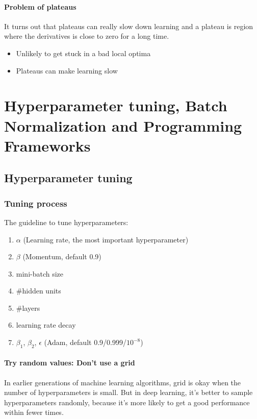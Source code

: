 \documentclass[UTF8]{article}
\begin{document}
\paragraph{Problem of plateaus}
It turns out that plateaus can really slow down learning and a plateau is region where the
derivatives is close to zero for a long time.

\begin{itemize}
    \item Unlikely to get stuck in a bad local optima
    \item Plateaus can make learning slow
\end{itemize}


\section{Hyperparameter tuning, Batch Normalization and Programming Frameworks}
\subsection{Hyperparameter tuning}
\subsubsection{Tuning process}
The guideline to tune hyperparameters:
\begin{enumerate}
    \item $\alpha$ \quad (Learning rate, the most important hyperparameter)
    \item $\beta$ \quad (Momentum, default 0.9)
    \item mini-batch size
    \item \#hidden units
    \item \#layers
    \item learning rate decay
    \item $\beta_1$, $\beta_2$, $\epsilon$ \quad (Adam, default 0.9/0.999/$10^{-8}$)
\end{enumerate}

\paragraph{Try random values: Don't use a grid}
In earlier generations of machine learning algorithms, grid is okay when the number of
hyperparameters is small. But in deep learning, it's better to sample hyperparameters randomly,
because it's more likely to get a good performance within fewer times.
\end{document}
